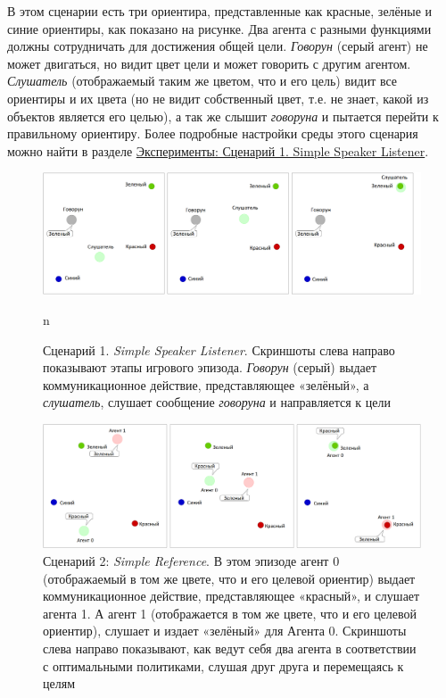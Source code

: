 В этом сценарии есть три ориентира, представленные как красные, зелёные и синие ориентиры, как показано на рисунке. Два агента с разными функциями должны сотрудничать для достижения общей цели. \textit{Говорун} (серый агент) не может двигаться, но видит цвет цели и может говорить с другим агентом. \textit{Слушатель} (отображаемый таким же цветом, что и его цель) видит все ориентиры и их цвета (но не видит собственный цвет, т.е. не знает, какой из объектов является его целью), а так же слышит \textit{говоруна} и пытается перейти к правильному ориентиру. Более подробные настройки среды этого сценария можно найти в разделе \hyperref[exp-ssl]{Эксперименты: Сценарий 1. Simple Speaker Listener}.

\begin{figure}[ht!] 
	\center
	\includegraphics [scale=0.41] {my_folder/images/intro/ssl.png}
	\caption{Сценарий 1. \textit{Simple Speaker Listener}. Скриншоты слева направо показывают этапы игрового эпизода. \textit{Говорун} (серый) выдает коммуникационное действие, представляющее «зелёный», а \textit{слушатель}, слушает сообщение \textit{говоруна} и направляется к цели}
n	\label{fig-intro-ssl}
\end{figure}

\begin{figure}[ht!] 
	\center
	\includegraphics [scale=0.38] {my_folder/images/intro/sr.png}
	\caption{Сценарий 2: \textit{Simple Reference}. В этом эпизоде агент 0 (отображаемый в том же цвете, что и его целевой ориентир) выдает коммуникационное действие, представляющее «красный», и слушает агента 1. А агент 1 (отображается в том же цвете, что и его целевой ориентир), слушает и издает «зелёный» для Агента 0. Скриншоты слева направо показывают, как ведут себя два агента в соответствии с оптимальными политиками, слушая друг друга и перемещаясь к целям}
	\label{fig-intro-sr}
\end{figure}

